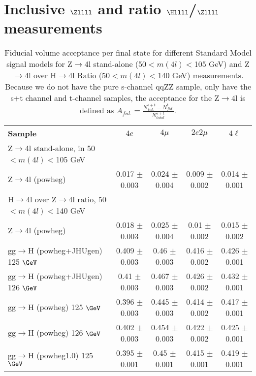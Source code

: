 \section{Inclusive \texorpdfstring{$\Zllll$}{Z to 4l} and ratio \texorpdfstring{$\Hllll$/$\Zllll$}{Hto4l/Zto4l} measurements}\label{sec:Inclusive_z4l_ratio_H4l}



\begin{sidewaystable}[!h!tb]
\begin{center}
\small
\caption{
Fiducial volume acceptance per final state for different Standard Model signal models 
for Z$\to$4l stand-alone (50$<m(4l)<$105 GeV) and Z$\to$4l over H$\to$4l Ratio (50$<m(4l)<$140 GeV) measurements.
Because we do not have the pure s-channel qqZZ sample, only have the s+t channel and t-channel samples, the acceptance for the Z$\to$4l is defined 
as $A_{fid.} = \frac{N^{s+t}_{fid.}-N^{t}_{fid.}}{N^{s+t}_{total}}$.
\label{tab:acceptanceRatio}
}
\begin{tabular}{|l|c|c|c|c|} \hline
Sample & $4e$ & $4\mu$ & $2e2\mu$ & $4\ell$ \\ \hline\hline
Z$\to$4l stand-alone, in 50$<m(4l)<$105 GeV & & & & \\\hline
Z$\to$4l ({\sc powheg})   & 0.017  $\pm$  0.003  & 0.024  $\pm$  0.004  & 0.009  $\pm$  0.002  & 0.014  $\pm$  0.001  \\
\hline\hline
H$\to$4l over Z$\to$4l ratio, 50$<m(4l)<$140 GeV & & & & \\\hline
Z$\to$4l ({\sc powheg})   & 0.018  $\pm$  0.003  & 0.025  $\pm$  0.004  & 0.01  $\pm$  0.002  & 0.015  $\pm$  0.002  \\
gg$\rightarrow$H ({\sc powheg+JHUgen}) 125 $\GeV$  & 0.409  $\pm$  0.003  & 0.46  $\pm$  0.003  & 0.416  $\pm$  0.002  & 0.426  $\pm$  0.001  \\
gg$\rightarrow$H ({\sc powheg+JHUgen}) 126 $\GeV$  & 0.41  $\pm$  0.003  & 0.467  $\pm$  0.003  & 0.426  $\pm$  0.002  & 0.432  $\pm$  0.001  \\
gg$\rightarrow$H ({\sc powheg}) 125 $\GeV$  & 0.396  $\pm$  0.003  & 0.445  $\pm$  0.003  & 0.414  $\pm$  0.002  & 0.417  $\pm$  0.001  \\
gg$\rightarrow$H ({\sc powheg}) 126 $\GeV$  & 0.402  $\pm$  0.003  & 0.454  $\pm$  0.003  & 0.422  $\pm$  0.002  & 0.425  $\pm$  0.001  \\
gg$\rightarrow$H ({\sc powheg1.0}) 125 $\GeV$  & 0.395  $\pm$  0.001  & 0.45  $\pm$  0.001  & 0.415  $\pm$  0.001  & 0.419  $\pm$  0.001  \\

\end{tabular}
\end{center}
\end{sidewaystable}
